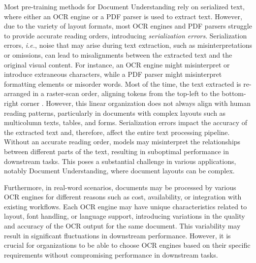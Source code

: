 Most pre-training methods for Document Understanding rely on serialized text, where either an \ac{OCR} engine or a PDF parser is used to extract text. However, due to the variety of layout formats, most \ac{OCR} engines and PDF parsers struggle to provide accurate reading orders, introducing \textit{serialization errors}. Serialization errors, \textit{i.e.}, noise that may arise during text extraction, such as misinterpretations or omissions, can lead to misalignments between the extracted text and the original visual content. For instance, an \ac{OCR} engine might misinterpret or introduce extraneous characters, while a PDF parser might misinterpret formatting elements or misorder words. Most of the time, the text extracted is re-arranged in a raster-scan order, aligning tokens from the top-left to the bottom-right corner \citep{clausner2013significance}. However, this linear organization does not always align with human reading patterns, particularly in documents with complex layouts such as multicolumn texts, tables, and forms. Serialization errors impact the accuracy of the extracted text and, therefore, affect the entire text processing pipeline. Without an accurate reading order, models may misinterpret the relationships between different parts of the text, resulting in suboptimal performance in downstream tasks. This poses a substantial challenge in various applications, notably Document Understanding, where document layouts can be complex. 

Furthermore, in real-word scenarios, documents may be processed by various \ac{OCR} engines for different reasons such as cost, availability, or integration with existing workflows. Each \ac{OCR} engine may have unique characteristics related to layout, font handling, or language support, introducing variations in the quality and accuracy of the \ac{OCR} output for the same document. This variability may result in significant fluctuations in downstream performance. However, it is crucial for organizations to be able to choose \ac{OCR} engines based on their specific requirements without compromising performance in downstream tasks.


